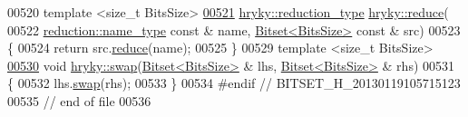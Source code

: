\begin{DoxyCode}
00520 \textcolor{comment}{}\textcolor{keyword}{template} <\textcolor{keywordtype}{size\_t} BitsSize>
\hypertarget{bitset_8h_source_l00521}{}\hyperlink{namespacehryky_af7b750a06d6c5b780d3473e3fa1e7bf9}{00521} \hyperlink{classhryky_1_1_intrusive_ptr}{hryky::reduction_type} \hyperlink{namespacehryky_af41cb3af6766761da0ff21b84527a52c}{hryky::reduce}(
00522     \hyperlink{classhryky_1_1reduction_1_1_string}{reduction::name_type} \textcolor{keyword}{const} & name, \hyperlink{classhryky_1_1_bitset}{Bitset<BitsSize>} \textcolor{keyword}{const} & src)
00523 \{
00524     \textcolor{keywordflow}{return} src.\hyperlink{classhryky_1_1_bitset_a1fe0a2bac8a887580781ef3d073dc120}{reduce}(name);
00525 \}
00529 \textcolor{keyword}{template} <\textcolor{keywordtype}{size\_t} BitsSize>
\hypertarget{bitset_8h_source_l00530}{}\hyperlink{namespacehryky_a73dbc149899a54cca88e0c14c00bb173}{00530} \textcolor{keywordtype}{void} \hyperlink{namespacehryky_a4282146df5ea2b68cb667896a2205909}{hryky::swap}(\hyperlink{classhryky_1_1_bitset}{Bitset<BitsSize>} & lhs, \hyperlink{classhryky_1_1_bitset}{Bitset<BitsSize>} & rhs)
00531 \{
00532     lhs.\hyperlink{classhryky_1_1_bitset_a85e9dae700136067e615b385ea8f4e14}{swap}(rhs);
00533 \}
00534 \textcolor{preprocessor}{#endif // BITSET\_H\_20130119105715123}
00535 \textcolor{preprocessor}{}\textcolor{comment}{// end of file}
00536 
\end{DoxyCode}
